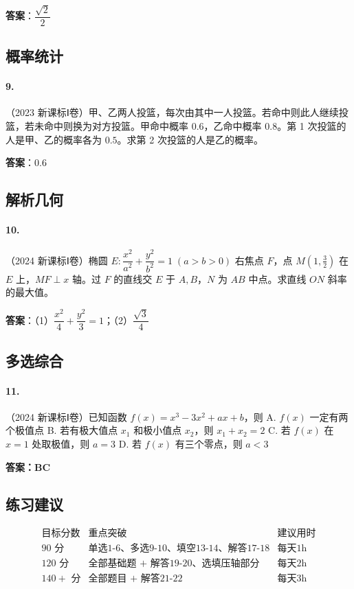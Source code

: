 \textbf{答案}：$\dfrac{\sqrt{2}}{2}$

\subsection{概率统计}

\paragraph{9.}（2023 新课标Ⅰ卷）甲、乙两人投篮，每次由其中一人投篮。若命中则此人继续投篮，若未命中则换为对方投篮。甲命中概率 $0.6$，乙命中概率 $0.8$。第 1 次投篮的人是甲、乙的概率各为 $0.5$。求第 2 次投篮的人是乙的概率。

\textbf{答案}：$0.6$

\subsection{解析几何}

\paragraph{10.}（2024 新课标Ⅰ卷）椭圆 $E:\dfrac{x^2}{a^2}+\dfrac{y^2}{b^2}=1\;(a>b>0)$ 右焦点 $F$，点 $M(1,\frac32)$ 在 $E$ 上，$MF\perp x$ 轴。过 $F$ 的直线交 $E$ 于 $A,B$，$N$ 为 $AB$ 中点。求直线 $ON$ 斜率的最大值。

\textbf{答案}：（1）$\dfrac{x^2}{4}+\dfrac{y^2}{3}=1$；（2）$\dfrac{\sqrt{3}}{4}$

\subsection{多选综合}

\paragraph{11.}（2024 新课标Ⅰ卷）已知函数 $f(x)=x^3-3x^2+ax+b$，则
A. $f(x)$ 一定有两个极值点
B. 若有极大值点 $x_1$ 和极小值点 $x_2$，则 $x_1+x_2=2$
C. 若 $f(x)$ 在 $x=1$ 处取极值，则 $a=3$
D. 若 $f(x)$ 有三个零点，则 $a<3$

\textbf{答案：BC}

\subsection*{练习建议}

\[
\begin{array}{c|c|c}
\text{目标分数} & \text{重点突破} & \text{建议用时} \\ \hline
90\text{ 分} & \text{单选1-6、多选9-10、填空13-14、解答17-18} & \text{每天1h} \\
120\text{ 分} & \text{全部基础题 + 解答19-20、选填压轴部分} & \text{每天2h} \\
140+\text{ 分} & \text{全部题目 + 解答21-22} & \text{每天3h}
\end{array}
\]
